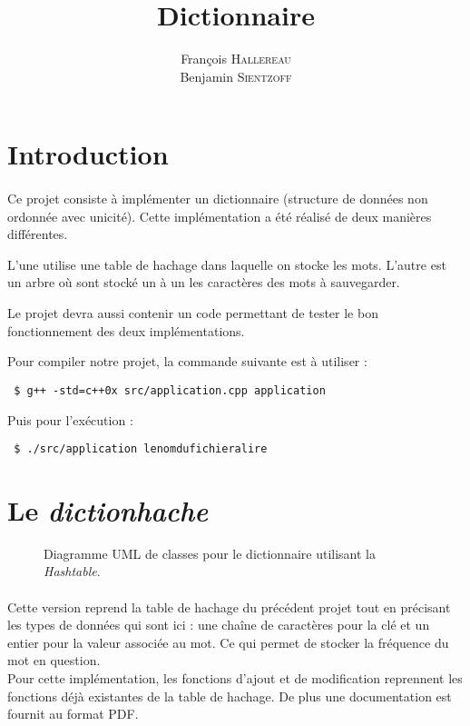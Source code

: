 \documentclass[12pt,a4paper,final]{article}
\author{François \textsc{Hallereau} \\ Benjamin \textsc{Sientzoff}}
\title{Dictionnaire}
\begin{document}
\maketitle

\vspace{5cm}

\tableofcontents

\newpage

\section*{Introduction}
\paragraph{}{
Ce projet consiste à implémenter un dictionnaire (structure de données non ordonnée avec unicité). Cette implémentation a été réalisé de deux manières différentes. 

L'une utilise une table de hachage dans laquelle on stocke les mots. L'autre est un arbre où sont stocké un à un les caractères des mots à sauvegarder.

Le projet devra aussi contenir un code permettant de tester le bon fonctionnement des deux implémentations.

Pour compiler notre projet, la commande suivante est à utiliser :
\begin{verbatim}
 $ g++ -std=c++0x src/application.cpp application
\end{verbatim}

Puis pour l'exécution :
\begin{verbatim}
 $ ./src/application lenomdufichieralire
\end{verbatim}
}


\newpage

\section{Le \emph{dictionhache}}

		\begin{figure}[h]
			\hspace{-1.8cm}
			
			\caption{Diagramme UML de classes pour le dictionnaire utilisant la \emph{Hashtable}.}
			\label{hashtable_uml}
		\end{figure}
		
	\paragraph{}{Cette version reprend la table de hachage du précédent projet tout en précisant les types de données qui sont ici : une chaîne de caractères pour la clé et un entier pour la valeur associée au mot. Ce qui permet de stocker la fréquence du mot en question. \\
Pour cette implémentation, les fonctions d'ajout et de modification reprennent les fonctions déjà existantes de la table de hachage. De plus une documentation est fournit au format PDF.}
\end{document}
